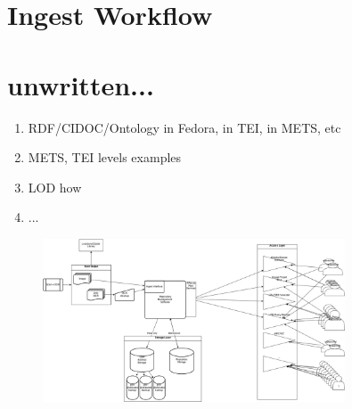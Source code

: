\documentclass[oneside, 12pt]{article}
\begin{document}
%

\section{Ingest Workflow}



\section{unwritten...}
\begin{enumerate}
  \item{RDF/CIDOC/Ontology in Fedora, in TEI, in METS, etc}
  \item{METS, TEI levels examples}
  \item{LOD how}
  \item{...}
\end{enumerate}

\begin{figure}[H]
  \centering
  \includegraphics[width=0.8\textwidth]{apc-01.png}
\end{figure}


\end{document}
